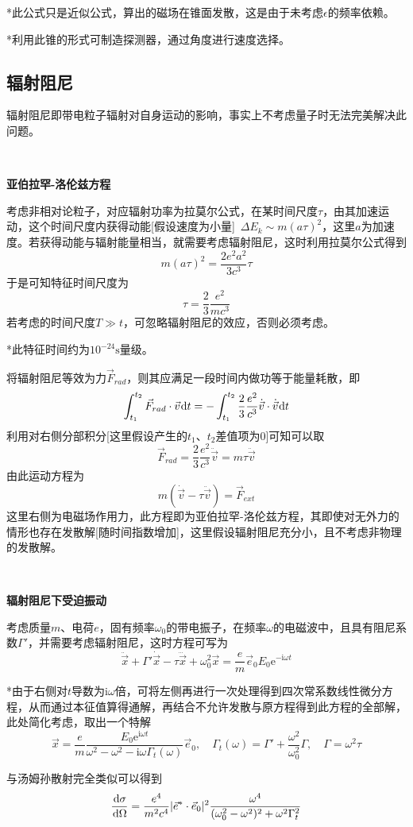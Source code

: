 \documentclass[a4paper,UTF8,fontset=windows]{ctexart}
\newcommand*{\dr}{\hspace{0.07em}\mathrm{d}}
\newcommand*{\er}{\mathrm{e}}
\newcommand*{\ir}{\mathrm{i}}
\newcommand*{\vf}{\vec{F}}
\newcommand*{\ves}{\vec{e}}
\newcommand*{\vvs}{\vec{v}}
\newcommand*{\vx}{\vec{x}}
\begin{document}
*此公式只是近似公式，算出的磁场在锥面发散，这是由于未考虑$\epsilon$的频率依赖。

*利用此锥的形式可制造探测器，通过角度进行速度选择。

\subsection{辐射阻尼}
辐射阻尼即带电粒子辐射对自身运动的影响，事实上不考虑量子时无法完美解决此问题。

\

\textbf{亚伯拉罕-洛伦兹方程}

考虑非相对论粒子，对应辐射功率为拉莫尔公式，在某时间尺度$\tau$，由其加速运动，这个时间尺度内获得动能[假设速度为小量]\ $\Delta E_k\sim m(a\tau)^2$，这里$a$为加速度。若获得动能与辐射能量相当，就需要考虑辐射阻尼，这时利用拉莫尔公式得到
$$m(a\tau)^2=\frac{2e^2a^2}{3c^3}\tau$$
于是可知特征时间尺度为
$$\tau=\frac{2}{3}\frac{e^2}{mc^3}$$
若考虑的时间尺度$T\gg t$，可忽略辐射阻尼的效应，否则必须考虑。

*此特征时间约为$10^{-24}\text{s}$量级。

将辐射阻尼等效为力$\vf_{rad}$，则其应满足一段时间内做功等于能量耗散，即
$$\int_{t_1}^{t_2}\vf_{rad}\cdot\vvs\dr t=-\int_{t_1}^{t_2}\frac{2}{3}\frac{e^2}{c^3}\dot{\vvs}\cdot\dot{\vvs}\dr t$$
利用对右侧分部积分[这里假设产生的$t_1$、$t_2$差值项为0]可知可以取
$$\vf_{rad}=\frac{2}{3}\frac{e^2}{c^3}\ddot{\vvs}=m\tau\ddot{\vvs}$$
由此运动方程为
$$m(\dot{\vvs}-\tau\ddot{\vvs})=\vf_{ext}$$
这里右侧为电磁场作用力，此方程即为亚伯拉罕-洛伦兹方程，其即使对无外力的情形也存在发散解[随时间指数增加]，这里假设辐射阻尼充分小，且不考虑非物理的发散解。

\

\textbf{辐射阻尼下受迫振动}

考虑质量$m$、电荷$e$，固有频率$\omega_0$的带电振子，在频率$\omega$的电磁波中，且具有阻尼系数$\Gamma'$，并需要考虑辐射阻尼，这时方程可写为
$$\ddot{\vx}+\Gamma'\dot{\vx}-\tau\dddot{\vx}+\omega_0^2\vx=\frac{e}{m}\ves_0E_0\er^{-\ir\omega t}$$

*由于右侧对$t$导数为$\ir\omega$倍，可将左侧再进行一次处理得到四次常系数线性微分方程，从而通过本征值算得通解，再结合不允许发散与原方程得到此方程的全部解，此处简化考虑，取出一个特解
$$\vx=\frac{e}{m}\frac{E_0\er^{\ir\omega t}}{\omega^2-\omega^2-\ir\omega\Gamma_t(\omega)}\ves_0,\quad\Gamma_t(\omega)=\Gamma'+\frac{\omega^2}{\omega_0^2}\Gamma,\quad\Gamma=\omega^2\tau$$

与汤姆孙散射完全类似可以得到
$$\frac{\dr\sigma}{\dr\Omega}=\frac{e^4}{m^2c^4}|\ves^*\cdot\ves_0|^2\frac{\omega^4}{(\omega_0^2-\omega^2)^2+\omega^2\Gamma_t^2}$$
\end{document}
